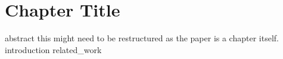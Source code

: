 \chapter{Chapter Title}
\label{chapter:3}

{abstract}
this might need to be restructured as the paper is a chapter itself. 
{introduction}
{related_work}